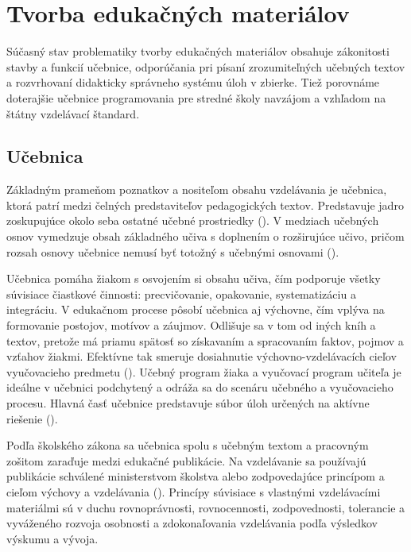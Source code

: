\chapter{Tvorba edukačných materiálov} 
Súčasný stav problematiky tvorby edukačných materiálov obsahuje zákonitosti stavby a funkcií učebnice, odporúčania pri písaní zrozumiteľných učebných textov a rozvrhovaní didakticky správneho systému úloh v zbierke. Tiež porovnáme doterajšie učebnice programovania pre stredné školy navzájom a vzhľadom na štátny vzdelávací štandard. 

\section{Učebnica}
Základným prameňom poznatkov a nositeľom obsahu vzdelávania je učebnica, ktorá patrí medzi čelných predstaviteľov pedagogických textov. Predstavuje jadro zoskupujúce okolo seba ostatné učebné prostriedky (\cite{zujev_ako_1986}). V medziach učebných osnov vymedzuje obsah základného učiva s doplnením o rozširujúce učivo, pričom rozsah osnovy učebnice nemusí byť totožný s učebnými osnovami (\cite{mlady_tvorba_1988}).

Učebnica pomáha žiakom s osvojením si obsahu učiva, čím podporuje všetky súvisiace čiastkové činnosti: precvičovanie, opakovanie, systematizáciu a integráciu. V edukačnom procese pôsobí učebnica aj výchovne, čím vplýva na formovanie postojov, motívov a záujmov. Odlišuje sa v tom od iných kníh a textov, pretože má priamu spätosť so získavaním a spracovaním faktov, pojmov a vzťahov žiakmi. Efektívne tak smeruje dosiahnutie výchovno-vzdelávacích cieľov vyučovacieho predmetu (\cite{gavora_ziak_1992}). Učebný program žiaka a vyučovací program učiteľa je ideálne v učebnici podchytený a odráža sa do scenáru učebného a vyučovacieho procesu. Hlavná časť učebnice predstavuje súbor úloh určených na aktívne riešenie (\cite{pavlovkin_ziak_1989}).

Podľa školského zákona sa učebnica spolu s učebným textom a pracovným zošitom zaraďuje medzi edukačné publikácie. Na vzdelávanie sa používajú publikácie schválené ministerstvom školstva alebo zodpovedajúce princípom a cieľom výchovy a vzdelávania (\cite{skolsky_zakon}). Princípy súvisiace s vlastnými vzdelávacími materiálmi sú v duchu rovnoprávnosti, rovnocennosti, zodpovednosti, tolerancie a vyváženého rozvoja osobnosti a zdokonaľovania vzdelávania podľa výsledkov výskumu a vývoja.


